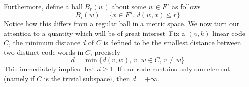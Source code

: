 \documentclass[../../main.tex]{subfiles}
\begin{document}
Furthermore, define a ball $B_r(w)$ about some $w\in F^n$ as follows
\begin{equation}\label{ball definition in F^n}
B_r(w) = \{x\in F^n,\, d(w,x)\leq r\}
\end{equation}
Notice how this differs from a regular ball in a metric space. We now turn our attention to a quantity which will be of great interest. Fix a $(n,k)$ linear code $C$, the minimum distance $d$ of $C$ is defined to be the smallest distance between two distinct code words in $C$, precisely
\begin{equation}\label{minimum distance code}
    d = \min\{d(v,w),\, v,\,w\in C,\, v\neq w\}
\end{equation}
This immediately implies that $d\geq 1$. If our code contains only one element (namely if $C$ is the trivial subspace), then $d = + \infty$.\\
\end{document}
